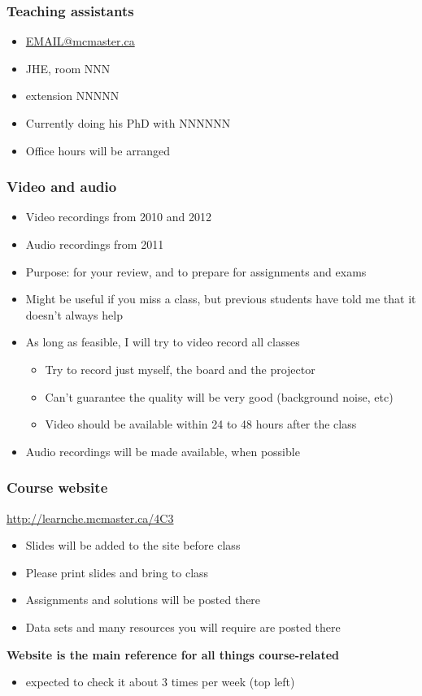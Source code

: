 \begin{frame}\frametitle{Teaching assistants}
	{\color{myGreen}{ONE}}
	\begin{itemize}
		\item	\url{EMAIL@mcmaster.ca}
		\item	JHE, room NNN
		\item	extension NNNNN
		\item	Currently doing his PhD with NNNNNN
		\item	Office hours will be arranged
	\end{itemize}
\end{frame}

\begin{frame}\frametitle{Video and audio}
	\begin{itemize}
		\item	Video recordings from 2010 and 2012 
		\item	Audio recordings from 2011
		\item	Purpose: for your review, and to prepare for assignments and exams 
		\item	Might be useful if you miss a class, but previous students have told me that it doesn't always help 
		\item	As long as feasible, I will try to video record all classes
		\begin{itemize}
			\item	Try to record just myself, the board and the projector 
			\item	Can't guarantee the quality will be very good (background noise, etc) 
			\item	Video should be available within 24 to 48 hours after the class 
		\end{itemize}
		\item	Audio recordings will be made available, when possible 
	\end{itemize}
\end{frame}

\begin{frame}\frametitle{Course website}
	
	\begin{exampleblock}{}
		\centering 
		\href{http://learnche.mcmaster.ca/4C3}{http://learnche.mcmaster.ca/4C3}
	\end{exampleblock}
	\begin{itemize}
		\item	Slides will be added to the site before class
		\item	Please print slides and bring to class
		\item	Assignments and solutions will be posted there
		\item	Data sets and many resources you will require are posted there
	\end{itemize}
	\vspace{12pt}
	\textbf{ Website is the main reference for all things course-related} 
	\begin{itemize}
		\item	expected to check it about 3 times per week {\tiny (top left)}
	\end{itemize}
\end{frame}

